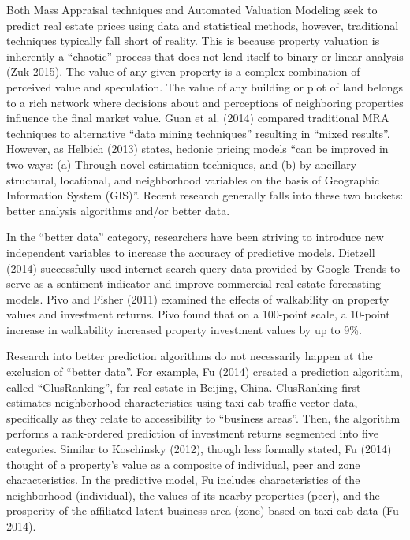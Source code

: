 \documentclass[]{article}
\begin{document}
Both Mass Appraisal techniques and Automated Valuation Modeling seek to
predict real estate prices using data and statistical methods, however,
traditional techniques typically fall short of reality. This is because
property valuation is inherently a ``chaotic'' process that does not
lend itself to binary or linear analysis (Zuk 2015). The value of any
given property is a complex combination of perceived value and
speculation. The value of any building or plot of land belongs to a rich
network where decisions about and perceptions of neighboring properties
influence the final market value. Guan et al. (2014) compared
traditional MRA techniques to alternative ``data mining techniques''
resulting in ``mixed results''. However, as Helbich (2013) states,
hedonic pricing models ``can be improved in two ways: (a) Through novel
estimation techniques, and (b) by ancillary structural, locational, and
neighborhood variables on the basis of Geographic Information System
(GIS)''. Recent research generally falls into these two buckets: better
analysis algorithms and/or better data.

In the ``better data'' category, researchers have been striving to
introduce new independent variables to increase the accuracy of
predictive models. Dietzell (2014) successfully used internet search
query data provided by Google Trends to serve as a sentiment indicator
and improve commercial real estate forecasting models. Pivo and Fisher
(2011) examined the effects of walkability on property values and
investment returns. Pivo found that on a 100-point scale, a 10-point
increase in walkability increased property investment values by up to
9\%.

Research into better prediction algorithms do not necessarily happen at
the exclusion of ``better data''. For example, Fu (2014) created a
prediction algorithm, called ``ClusRanking'', for real estate in
Beijing, China. ClusRanking first estimates neighborhood characteristics
using taxi cab traffic vector data, specifically as they relate to
accessibility to ``business areas''. Then, the algorithm performs a
rank-ordered prediction of investment returns segmented into five
categories. Similar to Koschinsky (2012), though less formally stated,
Fu (2014) thought of a property's value as a composite of individual,
peer and zone characteristics. In the predictive model, Fu includes
characteristics of the neighborhood (individual), the values of its
nearby properties (peer), and the prosperity of the affiliated latent
business area (zone) based on taxi cab data (Fu 2014).
\end{document}

